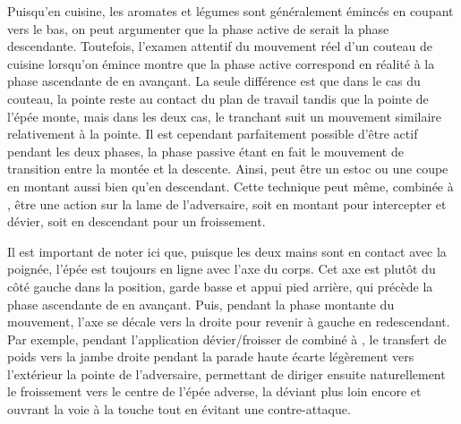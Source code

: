 Puisqu'en cuisine, les aromates et légumes sont généralement émincés en coupant vers le bas, on peut argumenter que la phase active de \Duo{} serait la phase descendante. Toutefois, l'examen attentif du mouvement réel d'un couteau de cuisine lorsqu'on émince montre que la phase active correspond en réalité à la phase ascendante de \Duo{} en avançant. La seule différence est que dans le cas du couteau, la pointe reste au contact du plan de travail tandis que la pointe de l'épée monte, mais dans les deux cas, le tranchant suit un mouvement similaire relativement à la pointe.
Il est cependant parfaitement possible d'être actif pendant les deux phases, la phase passive étant en fait le mouvement de transition entre la montée et la descente. Ainsi, \Duo{} peut être un estoc ou une coupe en montant aussi bien qu'en descendant. Cette technique peut même, combinée à \Mo{}, être une action sur la lame de l'adversaire, soit en montant pour intercepter et dévier, soit en descendant pour un froissement. 

Il est important de noter ici que, puisque les deux mains sont en contact avec la poignée, l'épée est toujours en ligne avec l'axe du corps. Cet axe est plutôt du côté gauche dans la position, garde basse et appui pied arrière, qui précède la phase ascendante de \Duo{} en avançant. Puis, pendant la phase montante du mouvement, l'axe se décale vers la droite pour revenir à gauche en redescendant. Par exemple, pendant l'application dévier/froisser de \Duo{} combiné à \Mo{}, le transfert de poids vers la jambe droite pendant la parade haute écarte légèrement vers l'extérieur la pointe de l'adversaire, permettant de diriger ensuite naturellement le froissement vers le centre de l'épée adverse, la déviant plus loin encore et ouvrant la voie à la touche tout en évitant une contre-attaque.



